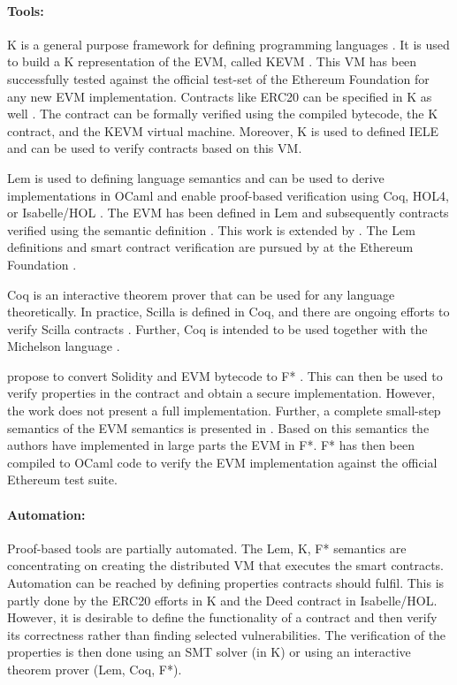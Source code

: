 \documentclass{llncs}
\begin{document}
\paragraph{Tools:} K is a general purpose framework for defining programming languages \cite{Rosu2007}. It is used to build a K representation of the EVM, called KEVM \cite{Hildenbrandt2017}. This VM has been successfully tested against the official test-set of the Ethereum Foundation for any new EVM implementation. Contracts like ERC20 can be specified in K as well \cite{Park2018}. The contract can be formally verified using the compiled bytecode, the K contract, and the KEVM virtual machine. Moreover, K is used to defined IELE \cite{Kasampalis2018} and can be used to verify contracts based on this VM.

Lem is used to defining language semantics and can be used to derive implementations in OCaml and enable proof-based verification using Coq, HOL4, or Isabelle/HOL \cite{Mulligan2014}. The EVM has been defined in Lem and subsequently contracts verified using the semantic definition \cite{Hirai2017}. This work is extended by \cite{Amani2018}. The Lem definitions and smart contract verification are pursued by \citeauthor{Hirai2018} at the Ethereum Foundation \cite{Hirai2018}.

Coq is an interactive theorem prover that can be used for any language theoretically. In practice, Scilla is defined in Coq, and there are ongoing efforts to verify Scilla contracts \cite{Sergey2018}. Further, Coq is intended to be used together with the Michelson language \cite{DynamicLedgerSolutions2017}.

\citeauthor{Bhargavan2016} propose to convert Solidity and EVM bytecode to F* \cite{Bhargavan2016}. This can then be used to verify properties in the contract and obtain a secure implementation. However, the work does not present a full implementation.
Further, a complete small-step semantics of the EVM semantics is presented in \cite{Grishchenko2018}. Based on this semantics the authors have implemented in large parts the EVM in F*. F* has then been compiled to OCaml code to verify the EVM implementation against the official Ethereum test suite.

\paragraph{Automation:} Proof-based tools are partially automated. The Lem, K, F* semantics are concentrating on creating the distributed VM that executes the smart contracts. Automation can be reached by defining properties contracts should fulfil. This is partly done by the ERC20 efforts in K and the Deed contract in Isabelle/HOL. However, it is desirable to define the functionality of a contract and then verify its correctness rather than finding selected vulnerabilities. The verification of the properties is then done using an SMT solver (in K) or using an interactive theorem prover (Lem, Coq, F*).
\end{document}
